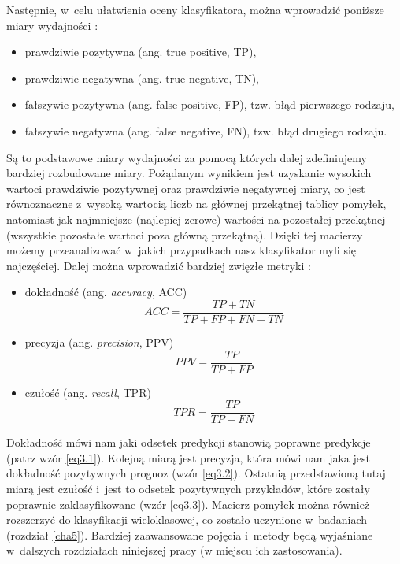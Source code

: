 \noindent Następnie, w~celu ułatwienia oceny klasyfikatora, można wprowadzić poniższe miary wydajności \cite{Sawka18, wiki:latex}:
\begin{itemize}
\item
prawdziwie pozytywna (ang. true positive, TP),

\item
prawdziwie negatywna (ang. true negative, TN),

\item
fałszywie pozytywna (ang. false positive, FP), tzw. błąd pierwszego rodzaju,

\item
fałszywie negatywna (ang. false negative, FN), tzw. błąd drugiego rodzaju.
\end{itemize}
\noindent Są to podstawowe miary wydajności za pomocą których dalej zdefiniujemy bardziej rozbudowane miary. Pożądanym wynikiem jest uzyskanie wysokich wartoci prawdziwie pozytywnej oraz prawdziwie negatywnej miary, co jest równoznaczne z~wysoką wartocią liczb na głównej przekątnej tablicy pomyłek, natomiast jak najmniejsze (najlepiej zerowe) wartości na pozostałej przekątnej (wszystkie pozostałe wartoci poza główną przekątną). Dzięki tej macierzy możemy przeanalizować w~jakich przypadkach nasz klasyfikator myli się najczęściej. Dalej można wprowadzić bardziej zwięzłe metryki \cite{Sawka18}:
\begin{itemize}

\item
dokładność (ang. \textit{accuracy}, ACC)
\begin{equation}
\label{eq3.1}
ACC=\frac {TP+TN} {TP+FP+FN+TN}
\end{equation}

\item
precyzja (ang. \textit{precision}, PPV)
\begin{equation}
\label{eq3.2}
PPV=\frac {TP} {TP+FP}
\end{equation}

\item
czułość (ang. \textit{recall}, TPR)
\begin{equation}
\label{eq3.3}
TPR=\frac {TP} {TP+FN}
\end{equation}
\end{itemize}

\noindent Dokładność mówi nam jaki odsetek predykcji stanowią poprawne predykcje (patrz wzór \ref{eq3.1}). Kolejną miarą jest precyzja, która mówi nam jaka jest dokładność pozytywnych prognoz (wzór \ref{eq3.2}). Ostatnią przedstawioną tutaj miarą jest czułość i~jest to odsetek pozytywnych przykładów, które zostały poprawnie zaklasyfikowane (wzór \ref{eq3.3}). Macierz pomyłek można również rozszerzyć do klasyfikacji wieloklasowej, co zostało uczynione w~badaniach (rozdział \ref{cha5}). Bardziej zaawansowane pojęcia i~metody będą wyjaśniane w~dalszych rozdziałach niniejszej pracy (w miejscu ich zastosowania).

